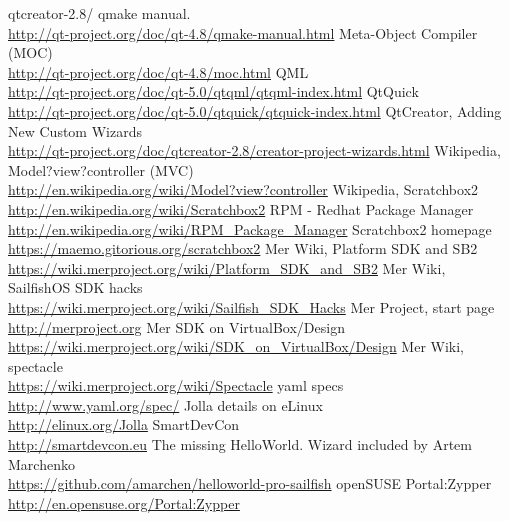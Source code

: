 \begin{thebibliography}{xxxxxxxxxxxx}
{qtcreator-2.8/}
 qmake manual. \\\url{http://qt-project.org/doc/qt-4.8/qmake-manual.html}
 Meta-Object Compiler (MOC) \\\url{http://qt-project.org/doc/qt-4.8/moc.html}
 QML \\\url{http://qt-project.org/doc/qt-5.0/qtqml/qtqml-index.html}
 QtQuick \\\url{http://qt-project.org/doc/qt-5.0/qtquick/qtquick-index.html}
 QtCreator, Adding New Custom Wizards\\\url{http://qt-project.org/doc/qtcreator-2.8/creator-project-wizards.html}
%
%
 Wikipedia, Model?view?controller (MVC) \\\url{http://en.wikipedia.org/wiki/Model?view?controller}
 Wikipedia, Scratchbox2 \\\url{http://en.wikipedia.org/wiki/Scratchbox2}
 RPM - Redhat Package Manager \\\url{http://en.wikipedia.org/wiki/RPM_Package_Manager}
%
%
 Scratchbox2 homepage \\\url{https://maemo.gitorious.org/scratchbox2}
%
%
 Mer Wiki, Platform SDK and SB2 \\\url{https://wiki.merproject.org/wiki/Platform_SDK_and_SB2}
 Mer Wiki, SailfishOS SDK hacks \\\url{https://wiki.merproject.org/wiki/Sailfish_SDK_Hacks}
 Mer Project, start page \\\url{http://merproject.org}
 Mer SDK on VirtualBox/Design \url{https://wiki.merproject.org/wiki/SDK_on_VirtualBox/Design}
 Mer Wiki, spectacle \\\url{https://wiki.merproject.org/wiki/Spectacle}
%
%
 yaml specs \\\url{http://www.yaml.org/spec/}
%
%
 Jolla details on eLinux \\\url{http://elinux.org/Jolla}
%
%
 SmartDevCon \\\url{http://smartdevcon.eu}
%
%
 The missing HelloWorld. Wizard included by Artem Marchenko \\\url{https://github.com/amarchen/helloworld-pro-sailfish}
%
%
 openSUSE Portal:Zypper \\\url{http://en.opensuse.org/Portal:Zypper}

\end{thebibliography}
